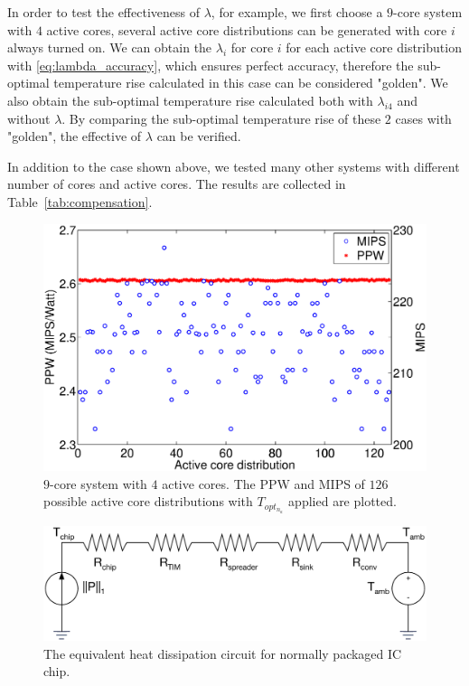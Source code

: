 In order to test the effectiveness of $\lambda$, for example, we first choose a $9$-core system with $4$ active cores, several active core distributions can be generated with core $i$ always turned on. We can obtain the $\lambda_{i}$ for core $i$ for each active core distribution with \eqref{eq:lambda_accuracy}, which ensures perfect accuracy, therefore the sub-optimal temperature rise calculated in this case can be considered "golden". We also obtain the sub-optimal temperature rise calculated both with $\lambda_{i4}$ and without $\lambda$. By comparing the sub-optimal temperature rise of these $2$ cases with "golden", the effective of $\lambda$ can be verified.

In addition to the case shown above, we tested many other systems with different number of cores and active cores. The results are collected in Table~\ref{tab:compensation}.

\begin{figure}
  \centering
  \includegraphics[width=0.9\columnwidth]{fig/mips_ppw.eps}
  \caption{$9$-core system with $4$ active cores. The PPW and MIPS of $126$ possible active core distributions with $T_{opt_{n_{a}}}$ applied are plotted.}
  \label{fig:mips_ppw}
\end{figure}
\begin{figure}
  \centering
  \includegraphics[width=0.8\columnwidth]{fig/resistor_line.eps}
  \caption{The equivalent heat dissipation circuit for normally
    packaged IC chip.}
  \label{fig:resistor_line}
\end{figure}



